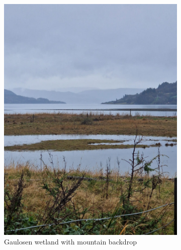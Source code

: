\documentclass[twocolumn]{article}
\begin{document}
\begin{figure}[h]
\centering
\begin{subfigure}{0.31\textwidth}
\centering
\includegraphics[width=\textwidth]{01_wetland_landscape_mountains.jpg}
\caption{Gaulosen wetland with mountain backdrop}
\end{subfigure}
\hfill
\begin{subfigure}{0.31\textwidth}
\centering

\end{subfigure}
\end{figure}
\end{document}
